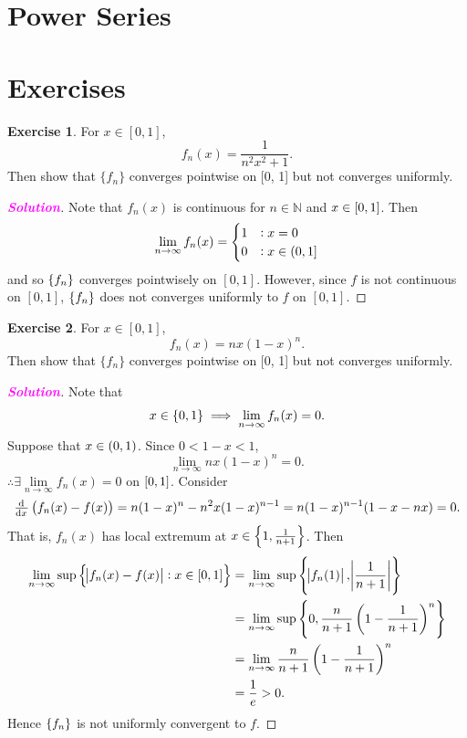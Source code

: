 \documentclass[12pt,openany]{book}
\theoremstyle{definition}
\newtheorem{exercise}{Exercise}[chapter]
\newcommand{\N}{\mathbb{N}}
\newcommand{\of}[1]{\left( #1 \right)}
\newcommand{\sol}{\textcolor{magenta}{\bf Solution}}
\begin{document}
	\section{Power Series}
	\newpage
	\section{Exercises}
	\begin{tcolorbox}[colframe=execolor, title={\color{white}\bf}]
		\begin{exercise}
			For \( x \in [0, 1] \),
			\[ f_n(x) = \frac{1}{n^2x^2 + 1}. \]
			Then show that \( \{f_n\} \) converges pointwise on [0, 1] but not converges uniformly.
		\end{exercise}
	\end{tcolorbox}
	\begin{proof}[\sol]
		Note that $f_n(x)$ is continuous for $n\in\N$ and $x\in\intcc{0,1}$. Then
		\[
		\lim\limits_{n\to\infty} f_n(x)= \begin{cases}
			1 &: x=0\\
			0 &: x\in\intoc{0,1}
		\end{cases}
		\] and so $\set{f_n}$ converges pointwisely on $[0,1]$. However, since $f$ is not continuous on $[0,1]$, $\set{f_n}$ does not converges uniformly to $f$ on $[0,1]$.
	\end{proof}
	\begin{tcolorbox}[colframe=execolor, title={\color{white}\bf}]
		\begin{exercise}
			For \( x \in [0, 1] \),
			\[ f_n(x) = nx(1 - x)^n. \]
			Then show that \( \{f_n\} \) converges pointwise on [0, 1] but not converges uniformly.
		\end{exercise}
	\end{tcolorbox}
	\begin{proof}[\sol]
		Note that \[
		x\in\set{0,1}\implies\lim\limits_{n\to\infty} f_n(x)=0.
		\] Suppose that $x\in\intoo{0,1}$. Since $0<1-x<1$, \[
		\lim\limits_{n\to\infty}nx(1-x)^n=0.
		\] $\therefore\exists\lim\limits_{n\to\infty} f_n(x)=0$ on $\intcc{0,1}$. Consider $$
		\od{}{x}\of{f_n(x)-f(x)}=n(1-x)^n-n^2x(1-x)^{n-1}=n(1-x)^{n-1}(1-x-nx)=0.
		$$ That is, $f_n(x)$ has local extremum at $x\in\set{1,\frac{1}{n+1}}$. Then \begin{align*}
			\lim\limits_{n\to\infty}\sup\set{\abs{f_n(x)-f(x)}:x\in\intcc{0,1}}
			&=\lim\limits_{n\to\infty}\sup\set{\abs{f_n(1)},\abs{\frac{1}{n+1}}}\\
			&=\lim\limits_{n\to\infty}\sup\set{0,\frac{n}{n+1}\of{1-\frac{1}{n+1}}^n}\\
			&=\lim\limits_{n\to\infty}\frac{n}{n+1}\of{1-\frac{1}{n+1}}^n\\
			&=\frac{1}{e}>0.
		\end{align*} Hence $\set{f_n}$ is not uniformly convergent to $f$.
	\end{proof}
\end{document}
